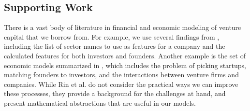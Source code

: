 \subsection{Supporting Work}

There is a vast body of literature in financial and economic modeling of venture capital that we borrow from. For example, we use several findings from \cite{2017arXiv170604229H}, including the list of sector names to use as features for a company and the calculated features for both investors and founders. Another example is the set of economic models summarized in \cite{venture-survey}, which includes the problem of picking startups, matching founders to investors, and the interactions between venture firms and companies. While Rin et al. do not consider the practical ways we can improve these processes, they provide a background for the challenges at hand, and present mathematical abstractions that are useful in our models.
